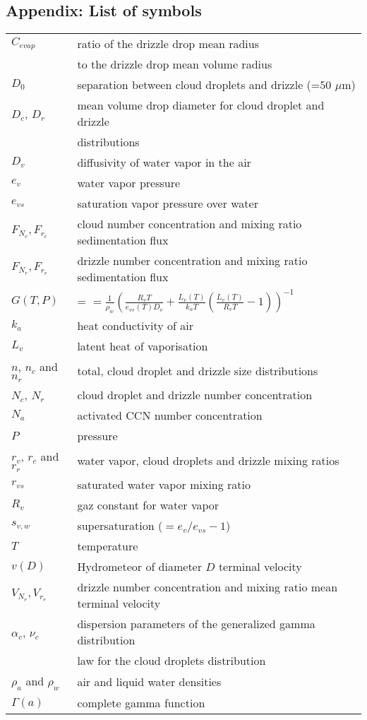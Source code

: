 \subsection*{Appendix: List of symbols}
\setlongtables
\begin{longtable}{ll}

$C_{evap}$ &ratio of the drizzle drop mean radius \\
           &to the drizzle drop mean volume radius\\
$D_0$&separation between cloud droplets and drizzle (=$50$ $\mu$m)\\
$D_c$, $D_r$&mean volume drop diameter for cloud droplet and drizzle\\
            &distributions\\
$D_v$&diffusivity of water vapor in the air\\
$e_v$&water vapor pressure\\
$e_{vs}$&saturation vapor pressure over water\\
$F_{N_c}, F_{r_c}$&cloud number concentration and mixing ratio sedimentation flux\\
$F_{N_r}, F_{r_r}$&drizzle number concentration and mixing ratio sedimentation flux\\
$G(T,P)$&= $ =\frac{1}{\rho_w}(\frac{R_vT}{e_{vs}(T)D_v}+\frac{L_v(T)}{k_aT}(\frac{L_v(T)}{R_vT}-1))^{-1}$ \\
$k_a$&heat conductivity of air\\
$L_v$&latent heat of vaporisation\\
$n$, $n_c$ and $n_r$&total, cloud droplet and drizzle size distributions\\
$N_c$, $N_r$&cloud droplet and drizzle number concentration\\ 
$N_a$ &activated CCN number concentration\\
$P$ &pressure\\

$r_v$, $r_c$ and $r_r$&water vapor, cloud droplets and drizzle mixing ratios\\
$r_{vs}$&saturated water vapor mixing ratio\\
$R_v$&gaz constant for water vapor\\
$s_{v,w}$&supersaturation ($=e_v/e_{vs}-1$)\\
$T$&temperature\\
$v(D)$&Hydrometeor of diameter $D$ terminal velocity \\
$V_{N_r}, V_{r_r}$&drizzle number concentration and mixing ratio mean terminal velocity\\
$\alpha_c$, $\nu_c$&dispersion parameters of the generalized gamma distribution\\
                      &law for the cloud droplets distribution\\
$\rho_a$ and $\rho_w$&air and liquid water densities\\
$\Gamma(a)$&complete gamma function\\
\end{longtable}



